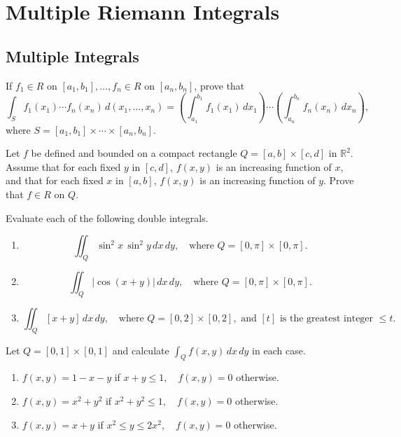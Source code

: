 \chapter{Multiple Riemann Integrals}
\section{Multiple Integrals}

\begin{problembox}
If \( f_1 \in R \) on \([a_1, b_1], \ldots, f_n \in R \) on \([a_n, b_n]\), prove that
\[ \int_{S} f_1(x_1) \cdots f_n(x_n) \, d(x_1, \ldots, x_n) = \left( \int_{a_1}^{b_1} f_1(x_1) \, dx_1 \right) \cdots \left( \int_{a_n}^{b_n} f_n(x_n) \, dx_n \right), \]
where \( S = [a_1, b_1] \times \cdots \times [a_n, b_n] \).
\end{problembox}

\begin{problembox}
Let \( f \) be defined and bounded on a compact rectangle \( Q = [a, b] \times [c, d] \) in \( \mathbb{R}^2 \). Assume that for each fixed \( y \) in \([c, d]\), \( f(x, y) \) is an increasing function of \( x \), and that for each fixed \( x \) in \([a, b]\), \( f(x, y) \) is an increasing function of \( y \). Prove that \( f \in R \) on \( Q \).
\end{problembox}

\begin{problembox}
Evaluate each of the following double integrals.
\begin{enumerate}[label=(\alph*)]
    \item \[ \iint_{Q} \sin^2 x \, \sin^2 y \, dx \, dy, \quad \text{where } Q = [0, \pi] \times [0, \pi]. \]
    \item \[ \iint_{Q} |\cos (x + y)| \, dx \, dy, \quad \text{where } Q = [0, \pi] \times [0, \pi]. \]
    \item \[ \iint_{Q} [x + y] \, dx \, dy, \quad \text{where } Q = [0, 2] \times [0, 2], \text{ and } [t] \text{ is the greatest integer } \leq t. \]
\end{enumerate}
\end{problembox}

\begin{problembox}
Let \( Q = [0, 1] \times [0, 1] \) and calculate \( \int_{Q} f(x, y) \, dx \, dy \) in each case.
\begin{enumerate}[label=(\alph*)]
    \item \( f(x, y) = 1 - x - y \) if \( x + y \leq 1, \quad f(x, y) = 0 \) otherwise.
    \item \( f(x, y) = x^2 + y^2 \) if \( x^2 + y^2 \leq 1, \quad f(x, y) = 0 \) otherwise.
    \item \( f(x, y) = x + y \) if \( x^2 \leq y \leq 2x^2, \quad f(x, y) = 0 \) otherwise.
\end{enumerate}
\end{problembox}

